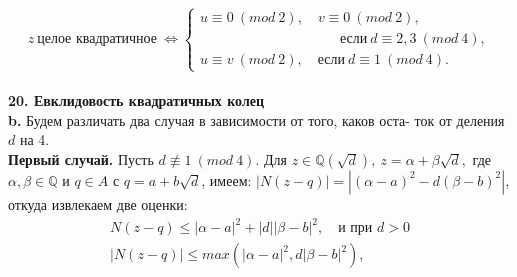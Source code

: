 \documentclass{mai_book}
\begin{document}
$$ z~\text{целое квадратичное}~\Leftrightarrow 
\begin{cases}
u\equiv0~(mod~2),\quad v\equiv0~(mod~2),\\
\qquad\qquad\qquad\qquad\qquad \text{если}~d\equiv2,3~(mod~4),\\
u\equiv v~(mod~2),\quad \text{если}~d\equiv1~(mod~4).
\end{cases}$$
\\
\noindent\textbf{20. Евклидовость квадратичных колец} \newline 
\\
\hspace*{15pt}\textbf{b.} Будем различать два случая в зависимости от того, каков оста­-\linebreak
ток от деления $d$ на 4.\newline
\\
\hspace*{15pt}\textbf{Первый случай.} Пусть $d\not\equiv1~(mod~4)$. Для $z\in\mathbb{Q}(\sqrt{d}),~z=\alpha+\beta\sqrt{d},$\linebreak
где $\alpha,\beta\in\mathbb{Q}$ и $q\in A$ с $q=a+b\sqrt{d}$, имеем: $|N(z-q)|=|(\alpha-a)^2-d(\beta-b)^2|$,\linebreak
откуда извлекаем две оценки:
\begin{eqnarray*}
N(z-q)\leqslant|\alpha-a|^2+|d||\beta-b|^2,\quad\text{и при }d>0\\
|N(z-q)|\leqslant max(|\alpha-a|^2,d|\beta-b|^2),\qquad
\end{eqnarray*}
\end{document}
